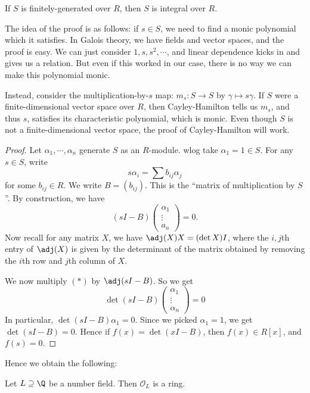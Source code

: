 \documentclass[a4paper]{article}
\begin{document}
\begin{thm}
  If $S$ is finitely-generated over $R$, then $S$ is integral over $R$.
\end{thm}
The idea of the proof is as follows: if $s \in S$, we need to find a monic polynomial which it satisfies. In Galois theory, we have fields and vector spaces, and the proof is easy. We can just consider $1, s, s^2, \cdots$, and linear dependence kicks in and gives us a relation. But even if this worked in our case, there is no way we can make this polynomial monic.

Instead, consider the multiplication-by-$s$ map: $m_s: S \to S$ by $\gamma \mapsto s\gamma$. If $S$ were a finite-dimensional vector space over $R$, then Cayley-Hamilton tells us $m_s$, and thus $s$, satisfies its characteristic polynomial, which is monic. Even though $S$ is not a finite-dimensional vector space, the proof of Cayley-Hamilton will work.

\begin{proof}
  Let $\alpha_1, \cdots, \alpha_n$ generate $S$ as an $R$-module. wlog take $\alpha_1 = 1 \in S$. For any $s \in S$, write
  \[
    s \alpha_i = \sum b_{ij}\alpha_j
  \]
  for some $b_{ij} \in R$. We write $B = (b_{ij})$. This is the ``matrix of multiplication by $S$''. By construction, we have
  \[
    (sI - B)
    \begin{pmatrix}
      \alpha_1\\\vdots\\a_n
    \end{pmatrix} = 0.\tag{$*$}
  \]
  Now recall for any matrix $X$, we have $\adj(X)X = (\det X) I$, where the $i, j$th entry of $\adj(X)$ is given by the determinant of the matrix obtained by removing the $i$th row and $j$th column of $X$.

  We now multiply $(*)$ by $\adj(s I - B)$. So we get
  \[
    \det(sI - B)
    \begin{pmatrix}
      \alpha_1\\\vdots\\\alpha_n
    \end{pmatrix} = 0
  \]
  In particular, $\det(sI - B) \alpha_1 = 0$. Since we picked $\alpha_1 = 1$, we get $\det(sI - B) = 0$. Hence if $f(x) = \det(xI - B)$, then $f(x) \in R[x]$, and $f(s) = 0$.
\end{proof}

Hence we obtain the following:
\begin{cor}
  Let $L \supseteq \Q$ be a number field. Then $\mathcal{O}_L$ is a ring.
\end{cor}
\end{document}
